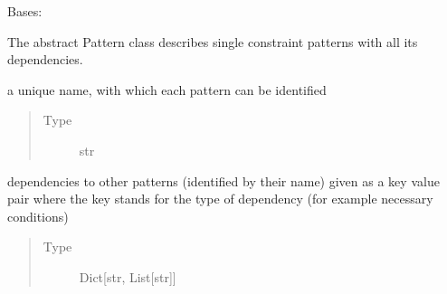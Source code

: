 \documentclass[letterpaper,10pt,english]{sphinxmanual}
\begin{document}
\begin{fulllineitems}
\label{\detokenize{event_log_analyzer:event_log_analyzer.pattern_library.pattern.Pattern}}
\sphinxAtStartPar
Bases: 

\sphinxAtStartPar
The abstract Pattern class describes single constraint patterns with all its dependencies.

\begin{fulllineitems}
\label{\detokenize{event_log_analyzer:event_log_analyzer.pattern_library.pattern.Pattern.name}}
\sphinxAtStartPar
a unique name, with which each pattern can be identified
\begin{quote}\begin{description}
\item[{Type}] \leavevmode
\sphinxAtStartPar
str

\end{description}\end{quote}

\end{fulllineitems}


\begin{fulllineitems}
\label{\detokenize{event_log_analyzer:event_log_analyzer.pattern_library.pattern.Pattern.dependencies}}
\sphinxAtStartPar
dependencies to other patterns (identified by their name) given as a key value pair where the key stands for the type of dependency (for example necessary conditions)
\begin{quote}\begin{description}
\item[{Type}] \leavevmode
\sphinxAtStartPar
Dict{[}str, List{[}str{]}{]}

\end{description}\end{quote}


\end{fulllineitems}
\end{fulllineitems}
\end{document}
